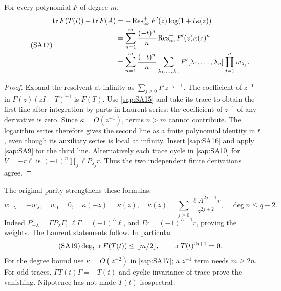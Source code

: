 \documentclass[11pt]{article}
\begin{document}
\begin{saptheorem}
For every polynomial $F$ of degree $m$,
\begin{equation}\tag{SA17}\label{sap:SA17}
\begin{split}
\operatorname{tr} F(T(t))-\operatorname{tr} F(A)
&=-\operatorname{Res}_\infty^+ F'(z)\log(1+t\kappa(z))\\
&=\sum_{n=1}^{m}\frac{(-t)^n}{n}
\operatorname{Res}_\infty^+ F'(z)\kappa(z)^n\\
&=\sum_{n=1}^{m}\frac{(-t)^n}{n}
\sum_{\lambda_1,\ldots,\lambda_n}
F'[\lambda_1,\ldots,\lambda_n]\prod_{j=1}^n w_{\lambda_j}.
\end{split}
\end{equation}
\end{saptheorem}
\begin{proof}
Expand the resolvent at infinity as
$\sum_{j\geq0}T^jz^{-j-1}$. The coefficient of $z^{-1}$
in $F(z)(zI-T)^{-1}$ is $F(T)$.
Use \eqref{sap:SA15} and take its trace to obtain the first
line after integration by parts in Laurent series:
the coefficient of $z^{-1}$ of any derivative is zero.
Since $\kappa=O(z^{-1})$, terms $n>m$ cannot contribute.
The logarithm series therefore gives the second line
as a finite polynomial identity in $t$, even though its
auxiliary series is local at infinity. Insert
\eqref{sap:SA16} and apply \eqref{sap:SA9} for the third line.
Alternatively each trace cycle in \eqref{sap:SA10} for
$V=-r\ell$ is $(-1)^n\prod_j\ell P_{\lambda_j}r$.
Thus the two independent finite derivations agree.
\end{proof}

The original parity strengthens these formulas:
\begin{equation}\tag{SA18}\label{sap:SA18}
w_{-\lambda}=-w_\lambda,\quad w_0=0,\quad
\kappa(-z)=\kappa(z),\quad
\kappa(z)=\sum_{j\geq0}\frac{\ell A^{2j+1}r}{z^{2j+2}},
\quad \deg n\leq q-2.
\end{equation}
Indeed $P_{-\lambda}=\Gamma P_\lambda\Gamma$,
$\ell\Gamma=(-1)^L\ell$, and
$\Gamma r=(-1)^{L+1}r$, proving the weights.
The Laurent statements follow. In particular
\begin{equation}\tag{SA19}\label{sap:SA19}
\deg_t\operatorname{tr} F(T(t))\leq\lfloor m/2\rfloor,\qquad
\operatorname{tr} T(t)^{2j+1}=0.
\end{equation}
For the degree bound use $\kappa=O(z^{-2})$ in
\eqref{sap:SA17}; a $z^{-1}$ term needs $m\geq2n$.
For odd traces, $\Gamma T(t)\Gamma=-T(t)$ and cyclic
invariance of trace prove the vanishing. Nilpotence
has not made $T(t)$ isospectral.
\end{document}
